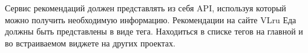 Сервис рекомендаций должен представлять из себя API, используя который можно получить
необходимую информацию.
Рекомендации на сайте VLru Еда должны быть представлены в виде тега. Находиться в
списке тегов на главной и во встраиваемом виджете на других проектах.
